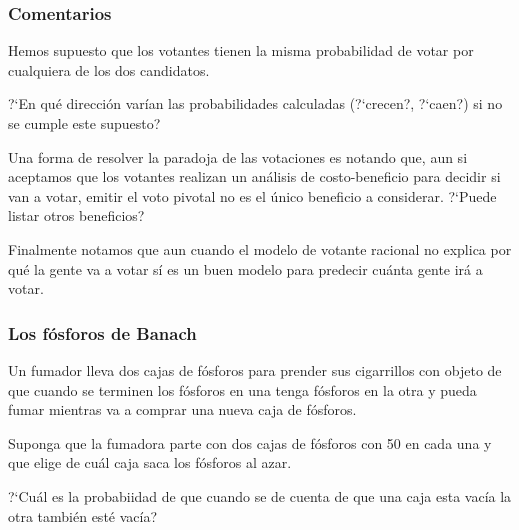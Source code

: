 \documentclass[9pt,handout]{beamer}
\begin{document}
\begin{frame}
\frametitle{Comentarios}

        Hemos supuesto que los votantes tienen la misma
         probabilidad de votar por cualquiera de los dos
         candidatos. 
         
         \bigskip
         
         ?`En qué dirección varían las probabilidades
         calculadas (?`crecen?, ?`caen?) si
         no se cumple este supuesto?
         
         \bigskip
         
         Una forma de resolver la paradoja de las votaciones
         es notando que, aun si aceptamos que los votantes realizan
         un análisis de costo-beneficio para decidir si
         van a votar, emitir el voto pivotal no es el único
         beneficio a considerar. ?`Puede listar otros beneficios?

         \bigskip
         
         Finalmente notamos que aun cuando el modelo
         de votante racional no explica por qué la gente
         va a votar sí es un buen modelo para predecir
         cuánta gente irá a votar. 
\end{frame}

\begin{frame}
\frametitle{Los fósforos de Banach}

Un fumador lleva dos cajas de fósforos para prender sus cigarrillos
con objeto de que cuando se terminen los fósforos en una tenga
fósforos en la otra y pueda fumar mientras va a comprar
una nueva caja de fósforos. 

\bigskip

Suponga que 
la fumadora parte con dos cajas de fósforos con 50 en cada una
y que elige de cuál caja saca los fósforos al azar. 

\bigskip

?`Cuál es la probabiidad de que cuando se de
cuenta de que una caja esta vacía la otra también esté vacía?
\end{frame}
\end{document}
